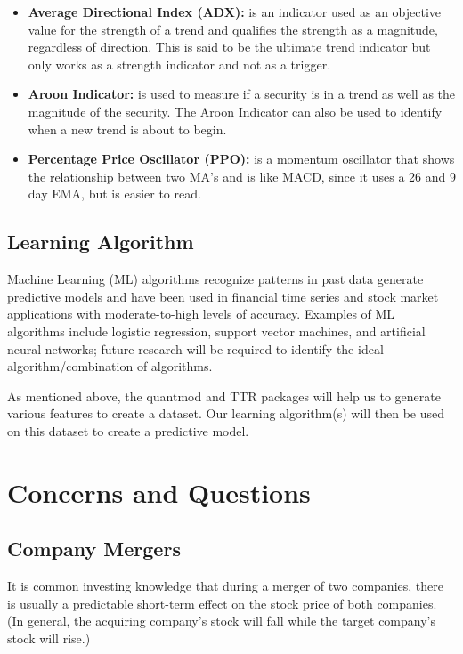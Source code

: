 \documentclass[11pt]{article}
\begin{document}
\begin{itemize}
\item \textbf{Average Directional Index (ADX):} is an indicator used as an objective value for the strength of a trend and qualifies the strength as a magnitude, regardless of direction. This is said to be the ultimate trend indicator but only works as a strength indicator and not as a trigger.
\item \textbf{Aroon Indicator:} is used to measure if a security is in a trend as well as the magnitude of the security. The Aroon Indicator can also be used to identify when a new trend is about to begin.
\item \textbf{Percentage Price Oscillator (PPO):} is a momentum oscillator that shows the relationship between two MA’s and is like MACD, since it uses a 26 and 9 day EMA, but is easier to read.
\end{itemize}

\subsection*{Learning Algorithm}\label{FP}
Machine Learning (ML) algorithms recognize patterns in past data generate predictive models and have been used in financial time series and stock market applications with moderate-to-high levels of accuracy.\textsuperscript{\cite{JSZ}\cite{MZ}\cite{ANHS}\cite{KK}\cite{BRS}} Examples of ML algorithms include logistic regression, support vector machines, and artificial neural networks; future research will be required to identify the ideal algorithm/combination of algorithms.

As mentioned above, the quantmod and TTR packages will help us to generate various features to create a dataset. Our learning algorithm(s) will then be used on this dataset to create a predictive model. 

\section*{\hspace{-.5cm} Concerns and Questions}\label{CQ}
\subsection*{Company Mergers}\label{CMerg}
It is common investing knowledge that during a merger of two companies, there is usually a predictable short-term effect on the stock price of both companies. (In general, the acquiring company's stock will fall while the target company's stock will rise.)\textsuperscript{\cite{INV}}
\end{document}
